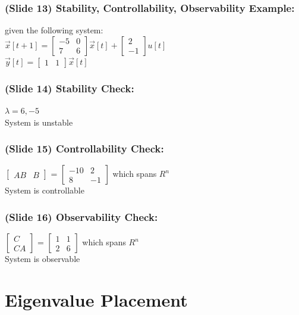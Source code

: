 \documentclass{beamer}
\begin{document}
\begin{frame}
\frametitle{(Slide 13) Stability, Controllability, Observability Example:}

given the following system: \\
$\vec{x}[t+1] = 
\begin{bmatrix}
-5 & 0 \\
7 & 6
\end{bmatrix}
\vec{x}[t] + 
\begin{bmatrix}
2 \\
-1
\end{bmatrix}
u[t]$\\
$
\vec{y}[t] =
\begin{bmatrix}
1 & 1
\end{bmatrix}
\vec{x}[t]$
\end{frame}

\begin{frame}
\frametitle{(Slide 14) Stability Check:}

$\lambda = 6, -5$\\ \pause
System is unstable
\end{frame}

\begin{frame}
\frametitle{(Slide 15) Controllability Check:}

$\begin{bmatrix}
AB & B
\end{bmatrix}$ = 
$\begin{bmatrix}
-10 & 2 \\
8 & -1
\end{bmatrix}$
which spans $R^{n}$ \\ \pause
System is controllable
\end{frame}

\begin{frame}
\frametitle{(Slide 16) Observability Check:}

$\begin{bmatrix}
C \\
CA
\end{bmatrix}$ = 
$\begin{bmatrix}
1 & 1 \\
2 & 6
\end{bmatrix}$ 
which spans $R^{n}$ \\ \pause
System is observable
\end{frame}

	\section{Eigenvalue Placement}
\end{document}
